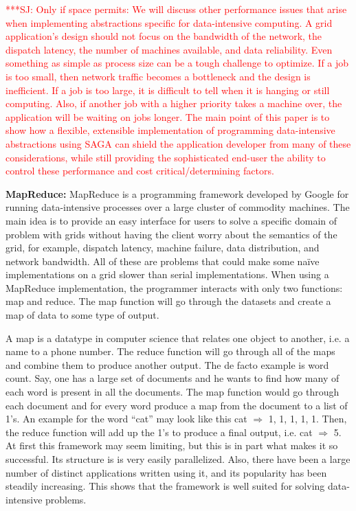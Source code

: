 \documentclass[conference,final]{IEEEtran}
\newcommand{\jhanote}[1]{ {\textcolor{red} { ***SJ: #1 }}}
\newcommand{\jhanote}[1]{}
\begin{document}
\jhanote{Only if space permits: We will discuss other performance
  issues that arise when implementing abstractions specific for
  data-intensive computing.  A grid application's design should not
  focus on the bandwidth of the network, the dispatch latency, the
  number of machines available, and data reliability.  Even something
  as simple as process size can be a tough challenge to optimize.  If
  a job is too small, then network traffic becomes a bottleneck and
  the design is inefficient.  If a job is too large, it is difficult
  to tell when it is hanging or still computing.  Also, if another job
  with a higher priority takes a machine over, the application will be
  waiting on jobs longer.  The main point of this paper is to show how
  a flexible, extensible implementation of programming data-intensive
  abstractions using SAGA can shield the application developer from
  many of these considerations, while still providing the
  sophisticated end-user the ability to control these performance and
  cost critical/determining factors.}

{\bf MapReduce: } MapReduce is a programming framework developed by
Google for running data-intensive processes over a large cluster of
commodity machines.  The main idea is to provide an easy interface for
users to solve a specific domain of problem with grids without having
the client worry about the semantics of the grid, for example,
dispatch latency, machine failure, data distribution, and network
bandwidth.  All of these are problems that could make some naïve
implementations on a grid slower than serial implementations.  When
using a MapReduce implementation, the programmer interacts with only
two functions: map and reduce.  The map function will go through the
datasets and create a map of data to some type of output.

A map is a datatype in computer science that relates one object to
another, i.e. a name to a phone number.  The reduce function will go
through all of the maps and combine them to produce another output.
The de facto example is word count.  Say, one has a large set of
documents and he wants to find how many of each word is present in all
the documents.  The map function would go through each document and
for every word produce a map from the document to a list of 1’s.  An
example for the word “cat” may look like this cat $\Rightarrow$ 1, 1,
1, 1, 1.  Then, the reduce function will add up the 1’s to produce a
final output, i.e. cat $\Rightarrow$ 5.  At first this framework may
seem limiting, but this is in part what makes it so successful.  Its
structure is is very easily parallelized.  Also, there have been a
large number of distinct applications written using it, and its
popularity has been steadily increasing.  This shows that the
framework is well suited for solving data-intensive problems.
\end{document}
